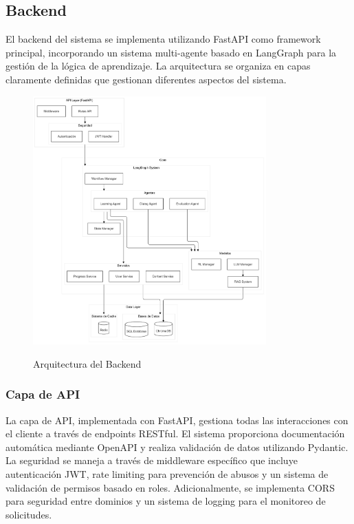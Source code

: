 \subsection{Backend}
\label{backend}

El backend del sistema se implementa utilizando FastAPI como framework principal, incorporando un sistema multi-agente basado en LangGraph para la gestión de la lógica de aprendizaje. La arquitectura se organiza en capas claramente definidas que gestionan diferentes aspectos del sistema.

\begin{figure}[H]
    \centering
    \caption{Arquitectura del Backend}
    \includegraphics[width=0.8\textwidth]{figuras/backend.png}
    \label{fig:arquitectura-backend}
\end{figure}

  

\subsubsection{Capa de API}
\label{capa-api}

La capa de API, implementada con FastAPI, gestiona todas las interacciones con el cliente a través de endpoints RESTful. El sistema proporciona documentación automática mediante OpenAPI y realiza validación de datos utilizando Pydantic. La seguridad se maneja a través de middleware específico que incluye autenticación JWT, rate limiting para prevención de abusos y un sistema de validación de permisos basado en roles. Adicionalmente, se implementa CORS para seguridad entre dominios y un sistema de logging para el monitoreo de solicitudes.

